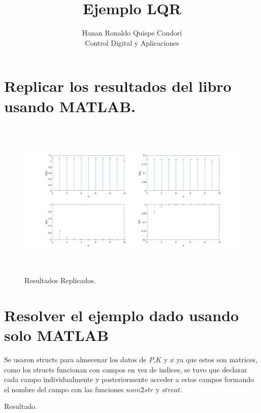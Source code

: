 \documentclass[12pt]{article}
\begin{document}
\title{Ejemplo LQR}
\author{Hanan Ronaldo Quispe Condori\\ %
Control Digital y Aplicaciones}

\maketitle
\section{Replicar los resultados del libro usando MATLAB.}



\begin{figure}[h]
    \centering
    \includegraphics[width=15cm, height=7.7cm]{imagenes/replica.jpg}
    \caption{Resultados Replicados.}
    \label{fig:freqz}
\end{figure}

\maketitle
\section{Resolver el ejemplo dado usando solo MATLAB}
Se usaron structs para almecenar los datos de $P$,$K$ y $x$ ya que estos son matrices, como los structs funcionan con campos en vez de indices, se tuvo que declarar cada campo individualmente y posteriormente acceder a estos campos formando el nombre del campo con las funciones $num2str$ y $strcat$.

Resultado.

\end{document}
